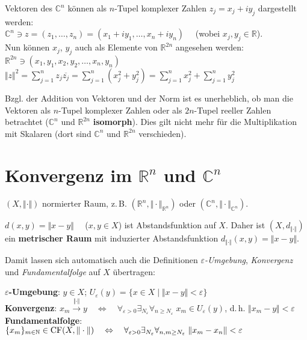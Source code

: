 Vektoren des $\mathbb{C}^n$ können als $n$-Tupel komplexer Zahlen
$z_j = x_j + iy_j$ dargestellt werden: \\
$\mathbb{C}^n \ni z = (z_1, \ldots, z_n) =
(x_1 + iy_1, \ldots, x_n + iy_n) \quad$
(wobei $x_j, y_j \in \mathbb{R}$). \\
Nun können $x_j$, $y_j$ auch als Elemente von $\mathbb{R}^{2n}$ angesehen
werden:
$\mathbb{R}^{2n} \ni (x_1, y_1, x_2, y_2, \ldots, x_n, y_n)$ \\
$\Vert z \Vert^2 = \sum_{j=1}^n z_j \overline{z_j} =
\sum_{j=1}^n (x_j^2 + y_j^2) = \sum_{j=1}^n x_j^2 + \sum_{j=1}^n y_j^2$

Bzgl. der Addition von Vektoren und der Norm ist es unerheblich, ob man die
Vektoren als $n$-Tupel komplexer Zahlen oder als $2n$-Tupel reeller Zahlen
betrachtet ($\mathbb{C}^n$ und $\mathbb{R}^{2n}$ \textbf{isomorph}).
Dies gilt nicht mehr für die Multiplikation mit Skalaren
(dort sind $\mathbb{C}^n$ und $\mathbb{R}^{2n}$ verschieden).

\section{%
    \texorpdfstring{Konvergenz im $\mathbb{R}^n$ und $\mathbb{C}^n$}%
    {Konvergenz im ℝⁿ und ℂⁿ}%
}

$(X, \Vert \cdot \Vert)$ normierter Raum, z.\,B.
$(\mathbb{R}^n, \Vert \cdot \Vert_{\mathbb{R}^n})$ oder
$(\mathbb{C}^n, \Vert \cdot \Vert_{\mathbb{C}^n})$.

$d(x,y) = \Vert x - y \Vert \quad$ ($x, y \in X$) ist Abstandsfunktion auf $X$.
Daher ist $(X, d_{\Vert \cdot \Vert})$ ein \textbf{metrischer Raum} mit
induzierter Abstandsfunktion
$d_{\Vert \cdot \Vert}(x, y) = \Vert x - y \Vert$.

Damit lassen sich automatisch auch die Definitionen
\emph{$\varepsilon$-Umgebung}, \emph{Konvergenz} und \emph{Fundamentalfolge}
auf $X$ übertragen:

\textbf{$\varepsilon$-Umgebung}: $y \in X$;\; $U_\varepsilon(y) =
\{x \in X \;|\; \Vert x - y \Vert < \varepsilon\}$ \\
\textbf{Konvergenz}:
$x_m \xrightarrow{\Vert \cdot \Vert} y \quad\Leftrightarrow\quad
\forall_{\varepsilon > 0} \exists_{N_\varepsilon}
\forall_{n \ge N_\varepsilon}\;
x_m \in U_\varepsilon(y)$, \;d.\,h. $\Vert x_m - y \Vert < \varepsilon$ \\
\textbf{Fundamentalfolge}:
$\{x_m\}_{m \in \mathbb{N}} \in \operatorname{CF}(X, \Vert \cdot \Vert)
\quad\Leftrightarrow\quad \forall_{\varepsilon > 0} \exists_{N_\varepsilon}
\forall_{n, m \ge N_\varepsilon}\; \Vert x_m - x_n \Vert < \varepsilon$

